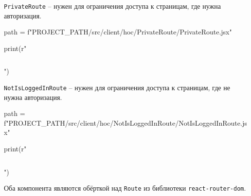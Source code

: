 \texttt{PrivateRoute} -- нужен для ограничения доступа к страницам, где нужна авторизация.

\begin{pycode}
path = f"{PROJECT_PATH}/src/client/hoc/PrivateRoute/PrivateRoute.jsx"

print(r"\inputminted{jsx}{" + path + r"}")
\end{pycode}

\texttt{NotIsLoggedInRoute} -- нужен для ограничения доступа к страницам, где не нужна авторизация.

\begin{pycode}
path = f"{PROJECT_PATH}/src/client/hoc/NotIsLoggedInRoute/NotIsLoggedInRoute.jsx"

print(r"\inputminted{jsx}{" + path + r"}")
\end{pycode}

Оба компонента являются обёрткой над \texttt{Route} из библиотеки \texttt{react-router-dom}.


